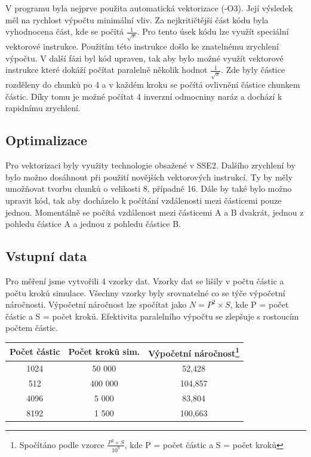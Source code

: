 \documentclass[12pt]{article}
\begin{document}
V prog\-ramu byla nej\-prve pou\-žita au\-toma\-tická vekto\-ri\-za\-ce (-O3).
Její výsledek měl na rychlost výpočtu minimální vliv. Za nejkritičtější část kódu byla vyhodnocena část, kde se počítá ${\frac{1}{\sqrt{x}}}$.
Pro tento úsek kódu lze využít speciální vektorové instrukce. Použitím této instrukce došlo ke znatelnému zrychlení výpočtu.
V další fázi byl kód upraven, tak aby bylo možné využít vektorové instrukce které dokáží počítat paralelně několik hodnot ${\frac{1}{\sqrt{x}}}$.
Zde byly částice rozděleny do chunků po 4 a v každém kroku se počítá ovlivnění částice chunkem částic.
Díky tomu je možné počítat 4 inverzní odmocniny naráz a dochází k rapidnímu zrychlení. 

\subsection{Optimalizace}
Pro vektorizaci byly využity technologie obsažené v SSE2. Dalšího zrychlení by bylo možno dosáhnout při použití novějších vektorových instrukcí.
Ty by měly umožňovat tvorbu chunků o velikosti 8, případně 16.
Dále by také bylo možno upravit kód, tak aby docházelo k počítání vzdálenosti mezi částicemi pouze jednou.
Momentálně se počítá vzdálenost mezi částicemi A a B dvakrát, jednou z pohledu částice A a jednou z pohledu částice B.

\subsection{Vstupní data}
Pro měření jsme vytvořili 4 vzorky dat. Vzorky dat se lišily v počtu částic a počtu kroků simulace.
Všechny vzorky byly srovnatelné co se týče výpočetní náročnosti. Výpočetní náročnost lze spočítat jako ${N = P^2 \times S}$, kde P = počet částic a S = počet kroků.
Efektivita paralelního výpočtu se zlepšuje s rostoucím počtem částic.

\begin{center}
\begin{tabular}{c | c | c }
\textbf{Počet částic} & \textbf{Počet kroků sim.}  & \textbf{Výpočetní náročnost}\footnote{Spočítáno podle vzorce ${\frac{P^2 \times S}{10^9}}$, kde P = počet částic a S = počet kroků} \\ \hline \hline
1024 & 50 000 & 52,428 \\ \hline
512 & 400 000 & 104,857 \\ \hline
4096 & 5 000 & 83,804 \\ \hline
8192 & 1 500 & 100,663 \\ \hline
\end{tabular}
\end{center}
\end{document}
